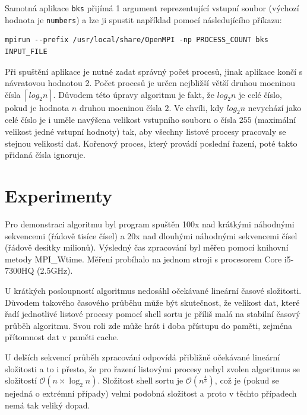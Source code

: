 \documentclass[11pt,a4paper,titlepage]{article}
\begin{document}
        Samotná aplikace \texttt{bks} přijímá 1 argument reprezentující vstupní soubor (výchozí hodnota je \texttt{numbers}) a lze ji spustit například pomocí následujícího příkazu:
\begin{verbatim}
mpirun --prefix /usr/local/share/OpenMPI -np PROCESS_COUNT bks INPUT_FILE
\end{verbatim}
        Při spuštění aplikace je nutné zadat správný počet procesů, jinak aplikace končí s návratovou hodnotou 2.
        Počet procesů je určen nejbližší větší druhou mocninou čísla $\left \lceil{log_2 n}\right \rceil$.
        Důvodem této úpravy algoritmu je fakt, že $log_2 n$ je celé číslo, pokud je hodnota $n$ druhou
        mocninou čísla $2$. Ve chvíli, kdy $log_2 n$ nevychází jako celé číslo je i uměle navýšena velikost vstupního
        souboru o čísla $255$ (maximální velikost jedné vstupní hodnoty) tak, aby všechny listové procesy pracovaly se stejnou
        velikostí dat. Kořenový proces, který provádí poslední řazení, poté takto přidaná čísla ignoruje.

	\section{Experimenty}
        Pro demonstraci algoritmu byl program spuštěn 100x nad krátkými náhodnými sekvencemi (řádově tisíce čísel) a 20x nad dlouhými náhodnými sekvencemi čísel (řádově desítky milionů).
        Výsledný čas zpracování byl měřen pomocí knihovní metody MPI\_Wtime. Měření probíhalo na jednom stroji s procesorem Core i5-7300HQ (2.5GHz).
        
        U krátkých posloupností algoritmus nedosáhl očekávané lineární časové složitosti. Důvodem takového časového průběhu může být skutečnost, že velikost dat, které řadí jednotlivé listové procesy pomocí shell sortu je příliš malá na stabilní časový průběh algoritmu. Svou roli zde může hrát i
        doba přístupu do paměti, zejména přítomnost dat v paměti cache.
        
        U delších sekvencí průběh zpracování odpovídá přibližně očekávané lineární složitosti a to i přesto, že pro řazení listovými procesy nebyl zvolen
        algoritmus se složitostí $\mathcal{O}(n \times \log_2 n)$. Složitost shell sortu je $\mathcal{O}(n^\frac{4}{3})$, což je (pokud se nejedná o extrémní případy) velmi podobná složitost a proto v těchto případech nemá tak veliký dopad.
        
\end{document}
